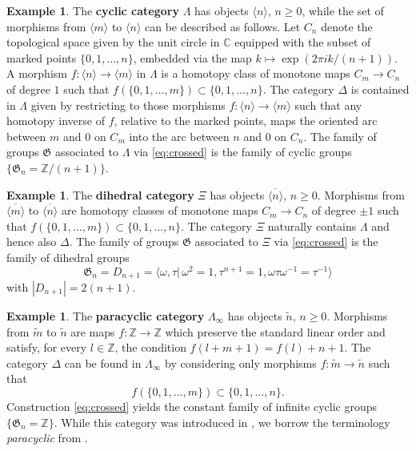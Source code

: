 \documentclass[english,11pt,leqno]{article}
\def\CC{\mathbb{C}}
\def\ZZ{\mathbb{Z}}
\def\Gen{\mathfrak{G}}
\def\cm{\langle m \rangle}
\def\cn{\langle n \rangle}
\def\cm{\langle m \rangle}
\def\cn{\langle n \rangle}
\def\dm{\overline{\langle m \rangle}}
\def\dn{\overline{\langle n \rangle}}
\def\pn{\widetilde{n}}
\def\ppm{\widetilde{m}}
\theoremstyle{definition}
\newtheorem{exa}[thm]{Example}
\theoremstyle{remark}
\numberwithin{equation}{section}
\begin{document}
\begin{exa}\label{ex:cyclic}
 	The {\bf cyclic category} $\Lambda$ has objects $\cn$, $n \ge 0$, while the set of
	morphisms from $\cm$ to $\cn$ can be described as follows. Let $C_n$ denote the topological
	space given by the unit circle in $\CC$ equipped with the subset of marked points $\{0, 1,
	\dots, n\}$, embedded via the map $k \mapsto \exp(2\pi i k /(n+1))$. A morphism $f: \cn \to
	\cm$ in $\Lambda$ is a homotopy class of monotone maps $C_m \to C_n$ of degree $1$ such
	that $f(\{0,1,\dots,m\}) \subset \{0,1,\dots,n\}$. The category $\Delta$ is contained in
	$\Lambda$ given by restricting to those morphisms $f: \cn \to \cm$ such that any homotopy
	inverse of $f$, relative to the marked points, maps the oriented arc between $m$ and $0$ on
	$C_m$ into the arc between $n$ and $0$ on $C_n$.
	The family of groups $\Gen$ associated to $\Lambda$ via \eqref{eq:crossed} is the family of cyclic
	groups $\{\Gen_n=\ZZ/(n+1)\}$.
\end{exa}

\begin{exa}\label{ex:dihedral}
 The {\bf dihedral category} $\Xi$ has objects $\dn$, $n \ge 0$. 
	Morphisms from $\dm$ to $\dn$ are homotopy classes of monotone 
	maps $C_m \to C_n$ of degree  $\pm 1$  such that $f(\{0,1,\dots,m\}) \subset
	\{0,1,\dots,n\}$. The category $\Xi$ naturally contains $\Lambda$ and hence also $\Delta$.
	The family of groups $\Gen$ associated to $\Xi$ via \eqref{eq:crossed} is the family of dihedral 
	groups
	  \[
	 \Gen_n = D_{n+1} = \langle \omega, \tau |\, \omega ^2=1, \tau^{n+1}=1, 
	 \omega\tau\omega^{-1} = \tau^{-1}\rangle 
	 \]	
	 with $|D_{n+1}| = 2(n+1)$.
\end{exa}
	  
\begin{exa} The {\bf paracyclic category} $\Lambda_{\infty}$ has objects $\pn$, $n \ge 0$. 
	Morphisms from $\ppm$ to $\pn$  are maps $f: \ZZ \to \ZZ$ which
	preserve the standard linear order and satisfy, for every $l \in \ZZ$, the condition $f(l +
	m+1) = f(l) + n + 1$. The category $\Delta$ can be found in $\Lambda_{\infty}$ by
	considering only morphisms $f:\ppm \to \pn$ such that 
	\[
	 f(\{0,1,\dots, m\}) \subset 
	\{0,1,\dots,n\}.
	\] 
	Construction \eqref{eq:crossed} yields the constant family
	of infinite cyclic groups $\{\Gen_n=\ZZ\}$. While this category was introduced in
	 \cite{fiedorowicz-loday}, we borrow
	the terminology {\em paracyclic} from \cite{getzler-jones}.
\end{exa}
\end{document}
